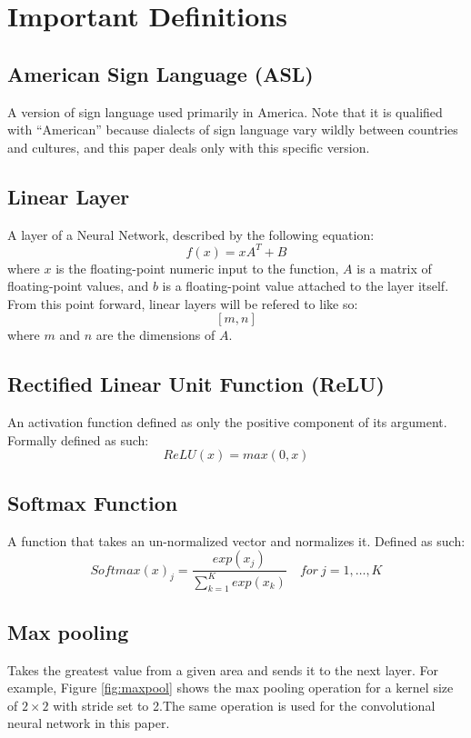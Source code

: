 \documentclass[10pt,Times New Roman]{article}
\begin{document}
\section{Important Definitions}
    \subsection{American Sign Language (ASL)}
        A version of sign language used primarily in America. Note that it is qualified with
        ``American'' because dialects of sign language vary wildly between countries and cultures,
        and this paper deals only with this specific version.

    \subsection{Linear Layer}\label{def:linearlayer}
        A layer of a Neural Network, described by the following equation:
        \[f(x) = xA^T + B\]
        where $x$ is the floating-point numeric input to the function, $A$ is a matrix of
        floating-point values, and $b$ is a floating-point value attached to the layer itself.
        From this point forward, linear layers will be refered to like so:
        \[[m,n]\]
        where $m$ and $n$ are the dimensions of $A$.

    \subsection{Rectified Linear Unit Function (ReLU)}
        An activation function defined as only the positive component of its argument. Formally
        defined as such:
        \[ReLU(x) = max(0,x)\]

    \subsection{Softmax Function}
        A function that takes an un-normalized vector and normalizes it. Defined as such:
        \[Softmax(x)_j = \frac{exp(x_j)}{\sum_{k=1}^K exp(x_k)}\quad for \ j=1,\ldots,K\]
    \subsection{Max pooling}
        Takes the greatest value from a given area and sends it to the next layer. For example,
        Figure \ref{fig:maxpool} shows the max pooling operation for a kernel size of $2\times2$ with
        stride set to 2.The same operation is used for the convolutional neural network in this paper.
\end{document}
